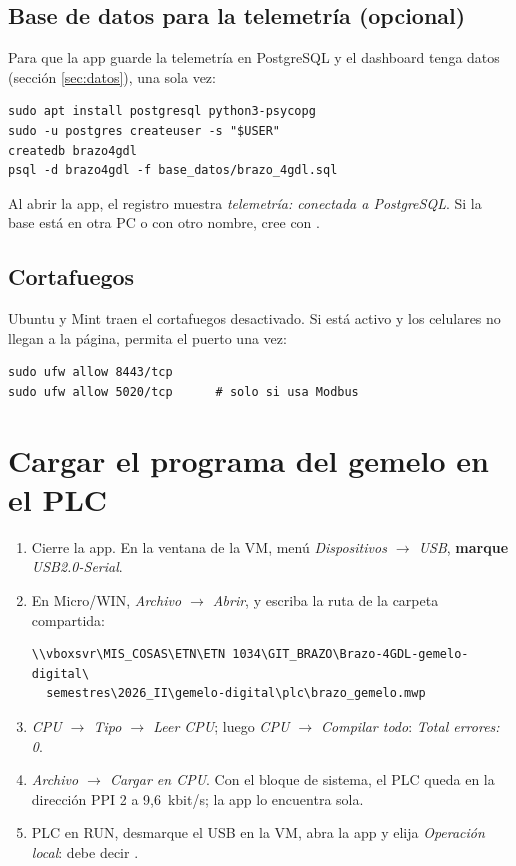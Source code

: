 \documentclass[a4paper,11pt]{article}
\begin{document}
\subsection*{Base de datos para la telemetría (opcional)}\label{sec:postgres}
Para que la app guarde la telemetría en PostgreSQL y el dashboard tenga datos (sección \ref{sec:datos}), una sola vez:
\begin{lstlisting}
sudo apt install postgresql python3-psycopg
sudo -u postgres createuser -s "$USER"
createdb brazo4gdl
psql -d brazo4gdl -f base_datos/brazo_4gdl.sql
\end{lstlisting}
Al abrir la app, el registro muestra \emph{telemetría: conectada a PostgreSQL}. Si la base está en otra PC o con otro nombre, cree  con .

\subsection*{Cortafuegos}
Ubuntu y Mint traen el cortafuegos  desactivado. Si está activo y los celulares no llegan a la página, permita el puerto una vez:
\begin{lstlisting}
sudo ufw allow 8443/tcp
sudo ufw allow 5020/tcp      # solo si usa Modbus
\end{lstlisting}



\section{Cargar el programa del gemelo en el PLC}\label{sec:cargar}
\begin{enumerate}
\item Cierre la app. En la ventana de la VM, menú \emph{Dispositivos $\rightarrow$ USB}, \textbf{marque} \emph{USB2.0-Serial}.
\item En Micro/WIN, \emph{Archivo $\rightarrow$ Abrir}, y escriba la ruta de la carpeta compartida:
\begin{lstlisting}
\\vboxsvr\MIS_COSAS\ETN\ETN 1034\GIT_BRAZO\Brazo-4GDL-gemelo-digital\
  semestres\2026_II\gemelo-digital\plc\brazo_gemelo.mwp
\end{lstlisting}
\item \emph{CPU $\rightarrow$ Tipo $\rightarrow$ Leer CPU}; luego \emph{CPU $\rightarrow$ Compilar todo}: \emph{Total errores: 0}.
\item \emph{Archivo $\rightarrow$ Cargar en CPU}. Con el bloque de sistema, el PLC queda en la dirección PPI 2 a 9,6~kbit/s; la app lo encuentra sola.
\item PLC en RUN, desmarque el USB en la VM, abra la app y elija \emph{Operación local}: debe decir \codigo{perfil "gemelo"}.
\end{enumerate}
\end{document}

